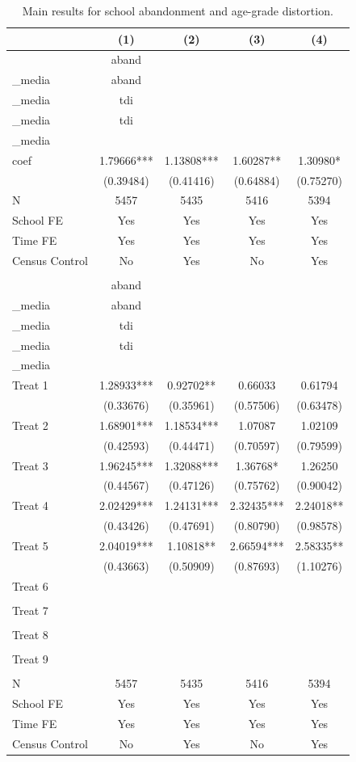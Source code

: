 \begin{table}[!htbp]
\centering
\caption{Main results for school abandonment and age-grade distortion.}
\label{tab:main_results_performance}
\begin{tabular}{lcccc}
\hline
  & (1) & (2) & (3) & (4) \\
\hline
  & aband\\_media & aband\\_media & tdi\\_media & tdi\\_media \\
coef & 1.79666*** & 1.13808*** & 1.60287** & 1.30980* \\
   & (0.39484) & (0.41416) & (0.64884) & (0.75270) \\
N & 5457 & 5435 & 5416 & 5394 \\
School FE & Yes & Yes & Yes & Yes \\
Time FE & Yes & Yes & Yes & Yes \\
Census Control & No & Yes & No & Yes \\
 &  &  &  &  \\
  & aband\\_media & aband\\_media & tdi\\_media & tdi\\_media \\
Treat 1 & 1.28933*** & 0.92702** & 0.66033 & 0.61794 \\
 & (0.33676) & (0.35961) & (0.57506) & (0.63478) \\
Treat 2 & 1.68901*** & 1.18534*** & 1.07087 & 1.02109 \\
 & (0.42593) & (0.44471) & (0.70597) & (0.79599) \\
Treat 3 & 1.96245*** & 1.32088*** & 1.36768* & 1.26250 \\
 & (0.44567) & (0.47126) & (0.75762) & (0.90042) \\
Treat 4 & 2.02429*** & 1.24131*** & 2.32435*** & 2.24018** \\
 & (0.43426) & (0.47691) & (0.80790) & (0.98578) \\
Treat 5 & 2.04019*** & 1.10818** & 2.66594*** & 2.58335** \\
 & (0.43663) & (0.50909) & (0.87693) & (1.10276) \\
Treat 6 &  &  &  &  \\
 &  &  &  &  \\
Treat 7 &  &  &  &  \\
 &  &  &  &  \\
Treat 8 &  &  &  &  \\
 &  &  &  &  \\
Treat 9 &  &  &  &  \\
 &  &  &  &  \\
N & 5457 & 5435 & 5416 & 5394 \\
School FE & Yes & Yes & Yes & Yes \\
Time FE & Yes & Yes & Yes & Yes \\
Census Control & No & Yes & No & Yes \\
\hline
\end{tabular}
\end{table}
